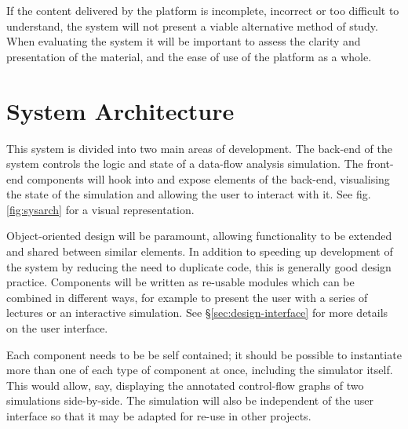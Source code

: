 \documentclass[bsc,twoside,singlespacing,parskip,logo,notimes,normalheadings]{infthesis}
\begin{document}
        If the content delivered by the platform is incomplete,
        incorrect or too difficult to understand, the system will not
        present a viable alternative method of study. When evaluating
        the system it will be important to assess the clarity and
        presentation of the material, and the ease of use of the
        platform as a whole.


    \section{System Architecture}
    This system is divided into two main areas of development.  The
    back-end of the system controls the logic and state of a data-flow
    analysis simulation. The front-end components will hook into and
    expose elements of the back-end, visualising the state of the
    simulation and allowing the user to interact with it. See
    fig. \ref{fig:sysarch} for a visual representation.
    
    Object-oriented design will be paramount, allowing functionality
    to be extended and shared between similar elements. In addition to
    speeding up development of the system by reducing the need to
    duplicate code, this is generally good design practice. Components
    will be written as re-usable modules which can be combined in
    different ways, for example to present the user with a series of
    lectures or an interactive simulation. See
    \S\ref{sec:design-interface} for more details on the user
    interface.

    Each component needs to be be self contained; it should be
    possible to instantiate more than one of each type of component at
    once, including the simulator itself. This would allow, say,
    displaying the annotated control-flow graphs of two simulations
    side-by-side. The simulation will also be independent of the user
    interface so that it may be adapted for re-use in other projects.
   
\end{document}
